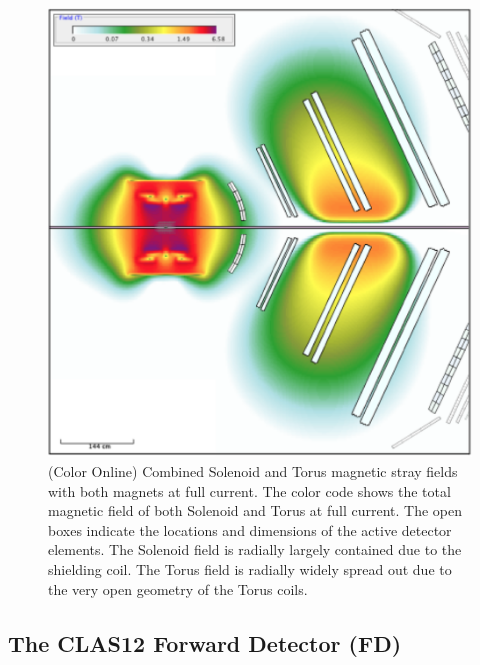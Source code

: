 \documentclass[final,3p,twocolumn]{elsarticle}
\begin{document}
\begin{figure}[htbp!]
\centerline{\includegraphics[width=1.0\columnwidth]{magfield-2.png}}
\caption{(Color Online) Combined Solenoid and Torus magnetic stray fields with both magnets at full current. The 
color code shows the total magnetic field of both Solenoid and Torus at full current. The open boxes indicate the 
locations and dimensions of the active detector elements. The Solenoid field is radially largely contained due to 
the shielding coil. The Torus field is radially widely spread out due to the very open geometry of the Torus coils.  }
\label{stray-field2}
\end{figure}

\subsection{The CLAS12 Forward Detector (FD)}
\end{document}
